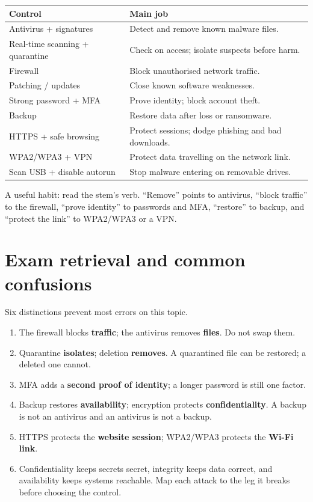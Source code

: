\documentclass[11pt]{article}
\begin{document}
\begin{center}
\begin{tabular}{p{}p{}}
\toprule
\textbf{Control} & \textbf{Main job} \\
\midrule
Antivirus + signatures & Detect and remove known malware files. \\
Real-time scanning + quarantine & Check on access; isolate suspects before harm. \\
Firewall & Block unauthorised network traffic. \\
Patching / updates & Close known software weaknesses. \\
Strong password + MFA & Prove identity; block account theft. \\
Backup & Restore data after loss or ransomware. \\
HTTPS + safe browsing & Protect sessions; dodge phishing and bad downloads. \\
WPA2/WPA3 + VPN & Protect data travelling on the network link. \\
Scan USB + disable autorun & Stop malware entering on removable drives. \\
\bottomrule
\end{tabular}
\end{center}

A useful habit: read the stem's verb. ``Remove'' points to antivirus,
``block traffic'' to the firewall, ``prove identity'' to passwords and MFA,
``restore'' to backup, and ``protect the link'' to WPA2/WPA3 or a VPN.

\section{Exam retrieval and common confusions}
Six distinctions prevent most errors on this topic.
\begin{enumerate}
  \item The firewall blocks \textbf{traffic}; the antivirus removes
    \textbf{files}. Do not swap them.
  \item Quarantine \textbf{isolates}; deletion \textbf{removes}. A
    quarantined file can be restored; a deleted one cannot.
  \item MFA adds a \textbf{second proof of identity}; a longer password is
    still one factor.
  \item Backup restores \textbf{availability}; encryption protects
    \textbf{confidentiality}. A backup is not an antivirus and an antivirus
    is not a backup.
  \item HTTPS protects the \textbf{website session}; WPA2/WPA3 protects the
    \textbf{Wi-Fi link}.
  \item Confidentiality keeps secrets secret, integrity keeps data correct,
    and availability keeps systems reachable. Map each attack to the leg it
    breaks before choosing the control.
\end{enumerate}
\end{document}
